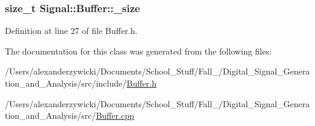 \hypertarget{class_signal_1_1_buffer_ab4c8969e972323306ee51538ad70577b}{
\subsubsection[{\+\_\+size}]{\setlength{\rightskip}{0pt plus 5cm}size\+\_\+t Signal\+::\+Buffer\+::\+\_\+size\hspace{0.3cm}{\ttfamily [protected]}}}\label{class_signal_1_1_buffer_ab4c8969e972323306ee51538ad70577b}


Definition at line 27 of file Buffer.\+h.



The documentation for this class was generated from the following files\+:\begin{DoxyCompactItemize}
\item 
/\+Users/alexanderzywicki/\+Documents/\+School\+\_\+\+Stuff/\+Fall\+\_/\+Digital\+\_\+\+Signal\+\_\+\+Generation\+\_\+and\+\_\+\+Analysis/src/include/\hyperlink{_buffer_8h}{Buffer.\+h}\item 
/\+Users/alexanderzywicki/\+Documents/\+School\+\_\+\+Stuff/\+Fall\+\_/\+Digital\+\_\+\+Signal\+\_\+\+Generation\+\_\+and\+\_\+\+Analysis/src/\hyperlink{_buffer_8cpp}{Buffer.\+cpp}\end{DoxyCompactItemize}
